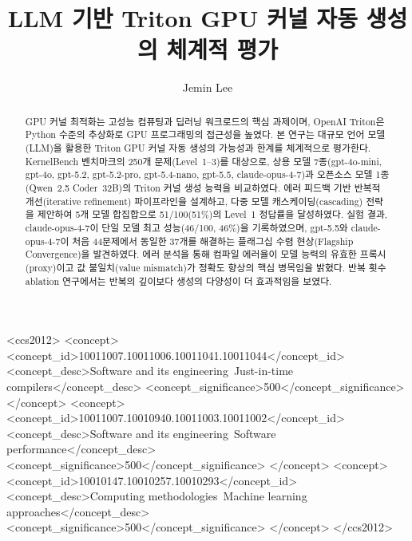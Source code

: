 \documentclass[sigplan,screen,review,anonymous]{acmart}
\begin{document}
\newcommand{\systemName}{\text{TritonGen}}

\newcommand{\paperTitle}{LLM 기반 Triton GPU 커널 자동 생성의 체계적 평가}

\title[\paperTitle]{\paperTitle}

\author{Jemin Lee}

\begin{abstract}
GPU 커널 최적화는 고성능 컴퓨팅과 딥러닝 워크로드의 핵심 과제이며,
OpenAI Triton은 Python 수준의 추상화로 GPU 프로그래밍의 접근성을 높였다.
본 연구는 대규모 언어 모델(LLM)을 활용한 Triton GPU 커널 자동 생성의
가능성과 한계를 체계적으로 평가한다.
KernelBench 벤치마크의 250개 문제(Level~1--3)를 대상으로,
상용 모델 7종(gpt-4o-mini, gpt-4o, gpt-5.2, gpt-5.2-pro, gpt-5.4-nano, gpt-5.5, claude-opus-4-7)과
오픈소스 모델 1종(Qwen~2.5 Coder~32B)의 Triton 커널 생성 능력을 비교하였다.
에러 피드백 기반 반복적 개선(iterative refinement) 파이프라인을 설계하고,
다중 모델 캐스케이딩(cascading) 전략을 제안하여
5개 모델 합집합으로 51/100(51\%)의 Level~1 정답률을 달성하였다.
실험 결과, claude-opus-4-7이 단일 모델 최고 성능(46/100, 46\%)을 기록하였으며,
gpt-5.5와 claude-opus-4-7이 처음 44문제에서 동일한 37개를 해결하는
플래그십 수렴 현상(Flagship Convergence)을 발견하였다.
에러 분석을 통해 컴파일 에러율이
모델 능력의 유효한 프록시(proxy)이고 값 불일치(value mismatch)가
정확도 향상의 핵심 병목임을 밝혔다.
반복 횟수 ablation 연구에서는 반복의 깊이보다 생성의 다양성이
더 효과적임을 보였다.
\end{abstract}

\begin{CCSXML}
<ccs2012>
   <concept>
       <concept_id>10011007.10011006.10011041.10011044</concept_id>
       <concept_desc>Software and its engineering~Just-in-time compilers</concept_desc>
       <concept_significance>500</concept_significance>
       </concept>
   <concept>
       <concept_id>10011007.10010940.10011003.10011002</concept_id>
       <concept_desc>Software and its engineering~Software performance</concept_desc>
       <concept_significance>500</concept_significance>
       </concept>
   <concept>
       <concept_id>10010147.10010257.10010293</concept_id>
       <concept_desc>Computing methodologies~Machine learning approaches</concept_desc>
       <concept_significance>500</concept_significance>
       </concept>
 </ccs2012>
\end{CCSXML}
\end{document}
